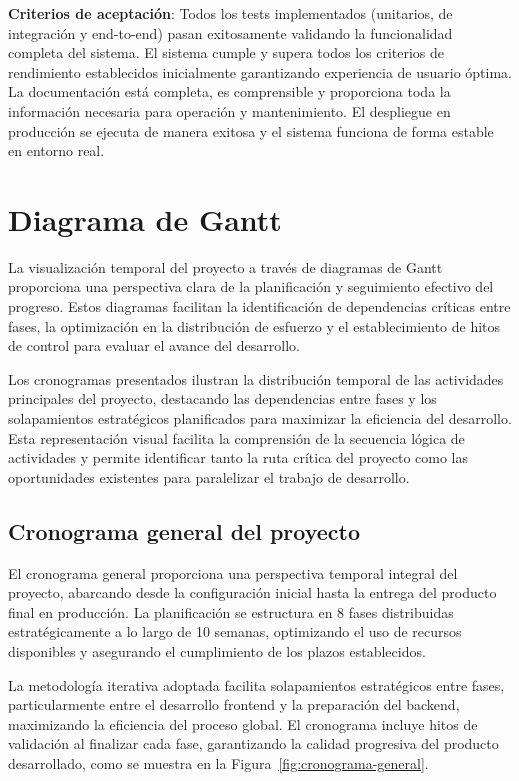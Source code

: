\documentclass[12pt,a4paper,oneside]{report}
\begin{document}
\textbf{Criterios de aceptación}: Todos los tests implementados (unitarios, de integración y end-to-end) pasan exitosamente validando la funcionalidad completa del sistema. El sistema cumple y supera todos los criterios de rendimiento establecidos inicialmente garantizando experiencia de usuario óptima. La documentación está completa, es comprensible y proporciona toda la información necesaria para operación y mantenimiento. El despliegue en producción se ejecuta de manera exitosa y el sistema funciona de forma estable en entorno real.

\section{Diagrama de Gantt}\label{diagrama-de-gantt}

La visualización temporal del proyecto a través de diagramas de Gantt proporciona una perspectiva clara de la planificación y seguimiento efectivo del progreso. Estos diagramas facilitan la identificación de dependencias críticas entre fases, la optimización en la distribución de esfuerzo y el establecimiento de hitos de control para evaluar el avance del desarrollo.

Los cronogramas presentados ilustran la distribución temporal de las actividades principales del proyecto, destacando las dependencias entre fases y los solapamientos estratégicos planificados para maximizar la eficiencia del desarrollo. Esta representación visual facilita la comprensión de la secuencia lógica de actividades y permite identificar tanto la ruta crítica del proyecto como las oportunidades existentes para paralelizar el trabajo de desarrollo.

\subsection{Cronograma general del
proyecto}\label{cronograma-general-del-proyecto}

El cronograma general proporciona una perspectiva temporal integral del proyecto, abarcando desde la configuración inicial hasta la entrega del producto final en producción. La planificación se estructura en 8 fases distribuidas estratégicamente a lo largo de 10 semanas, optimizando el uso de recursos disponibles y asegurando el cumplimiento de los plazos establecidos.

La metodología iterativa adoptada facilita solapamientos estratégicos entre fases, particularmente entre el desarrollo frontend y la preparación del backend, maximizando la eficiencia del proceso global. El cronograma incluye hitos de validación al finalizar cada fase, garantizando la calidad progresiva del producto desarrollado, como se muestra en la Figura~\ref{fig:cronograma-general}.
\end{document}
